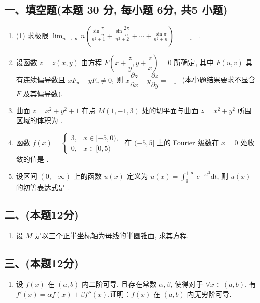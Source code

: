 \subsection*{一、填空题(本题 30 分,  每小题 6分,  共5 小题)}
\begin{enumerate}
    \item (1) 求极限 $\displaystyle\lim_{n \to \infty} n \left( \frac{\sin \dfrac{\pi}{n}}{n^2 + 1} + \frac{\sin \dfrac{2\pi}{n}}{n^2 + 2} + \cdots + \frac{\sin \pi}{n^2 + n} \right) = \underline{\quad\quad}. $
    \item 设函数 $z = z(x,  y)$ 由方程 $F\left(x + \dfrac{z}{y},  y + \dfrac{z}{x}\right) = 0$ 所确定,  其中 $F(u,  v)$ 具有连续偏导数且 $xF_u + yF_v \neq 0$,  则 $x \dfrac{\partial z}{\partial x} + y \dfrac{\partial z}{\partial y} = \underline{\quad\quad}$(本小题结果要求不显含 $F$ 及其偏导数).
    \item 曲面 $z = x^2 + y^2 + 1$ 在点 $M(1,  -1,  3)$ 处的切平面与曲面 $z = x^2 + y^2$ 所围区域的体积为 \underline{\quad\quad}.
    \item 函数 $f(x) =
              \begin{cases}
                  3, & x \in [-5,  0), \\
                  0, & x \in [0,  5)
              \end{cases}$ 在 $(-5,  5]$ 上的 Fourier 级数在 $x = 0$ 处收敛的值是 \underline{\quad\quad}.
    \item 设区间 $(0,  +\infty)$ 上的函数 $u(x)$ 定义为 $u(x) = \displaystyle\int_0^{+\infty} e^{-xt^2}  \mathrm{d}t$,  则 $u(x)$ 的初等表达式是 \underline{\quad\quad}.

\end{enumerate}

\subsection*{二、(本题12分)}
\begin{enumerate}[start=6]
    \item 设 $M$ 是以三个正半坐标轴为母线的半圆锥面,  求其方程.
\end{enumerate}

\subsection*{三、(本题12分)}
\begin{enumerate}[start=7]
    \item 设 $f(x)$ 在 $(a,  b)$ 内二阶可导,  且存在常数 $\alpha,  \beta$,  使得对于 $\forall x \in (a,  b)$,  有 $f'(x) = \alpha f(x) + \beta f''(x)$.证明：$f(x)$ 在 $(a,  b)$ 内无穷阶可导.
\end{enumerate}

